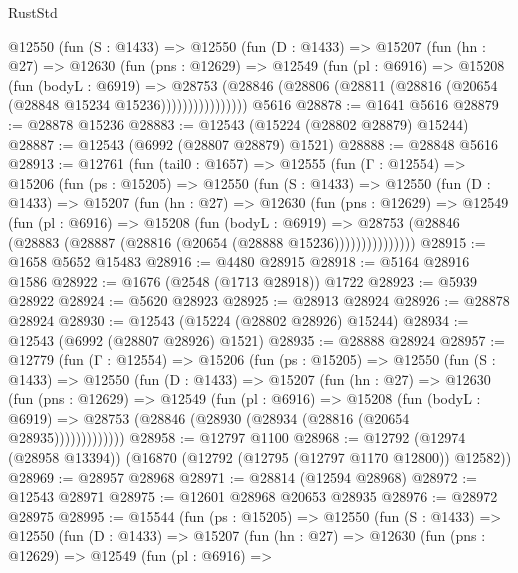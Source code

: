 \begin{lexlean}{RustStd}
\begin{coremodule}
          @12550
            (fun (S : @1433) =>
            @12550
              (fun (D : @1433) =>
              @15207
                (fun (hn : @27) =>
                @12630
                  (fun (pns : @12629) =>
                  @12549
                    (fun (pl : @6916) =>
                    @15208
                      (fun (bodyL : @6919) =>
                      @28753
                        (@28846
                          (@28806 (@28811 (@28816 (@20654 (@28848 @15234 @15236))))))))))))))))
    @5616
@28878 := @1641 @5616
@28879 := @28878 @15236
@28883 := @12543 (@15224 (@28802 @28879) @15244)
@28887 := @12543 (@6992 (@28807 @28879) @1521)
@28888 := @28848 @5616
@28913 := @12761
    (fun (tail0 : @1657) =>
    @12555
      (fun (Γ : @12554) =>
      @15206
        (fun (ps : @15205) =>
        @12550
          (fun (S : @1433) =>
          @12550
            (fun (D : @1433) =>
            @15207
              (fun (hn : @27) =>
              @12630
                (fun (pns : @12629) =>
                @12549
                  (fun (pl : @6916) =>
                  @15208
                    (fun (bodyL : @6919) =>
                    @28753 (@28846 (@28883 (@28887 (@28816 (@20654 (@28888 @15236)))))))))))))))
@28915 := @1658 @5652 @15483
@28916 := @4480 @28915
@28918 := @5164 @28916 @1586
@28922 := @1676 (@2548 (@1713 @28918)) @1722
@28923 := @5939 @28922
@28924 := @5620 @28923
@28925 := @28913 @28924
@28926 := @28878 @28924
@28930 := @12543 (@15224 (@28802 @28926) @15244)
@28934 := @12543 (@6992 (@28807 @28926) @1521)
@28935 := @28888 @28924
@28957 := @12779
    (fun (Γ : @12554) =>
    @15206
      (fun (ps : @15205) =>
      @12550
        (fun (S : @1433) =>
        @12550
          (fun (D : @1433) =>
          @15207
            (fun (hn : @27) =>
            @12630
              (fun (pns : @12629) =>
              @12549
                (fun (pl : @6916) =>
                @15208
                  (fun (bodyL : @6919) =>
                  @28753 (@28846 (@28930 (@28934 (@28816 (@20654 @28935)))))))))))))
@28958 := @12797 @1100
@28968 := @12792 (@12974 (@28958 @13394)) (@16870 (@12792 (@12795 (@12797 @1170 @12800)) @12582))
@28969 := @28957 @28968
@28971 := @28814 (@12594 @28968)
@28972 := @12543 @28971
@28975 := @12601 @28968 @20653 @28935
@28976 := @28972 @28975
@28995 := @15544
    (fun (ps : @15205) =>
    @12550
      (fun (S : @1433) =>
      @12550
        (fun (D : @1433) =>
        @15207
          (fun (hn : @27) =>
          @12630
            (fun (pns : @12629) =>
            @12549
              (fun (pl : @6916) =>

\end{coremodule}
\end{lexlean}
